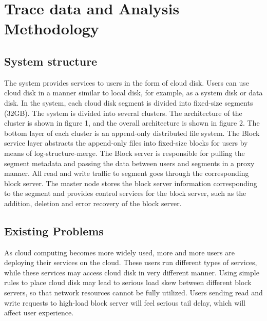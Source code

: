 \section{Trace data and Analysis Methodology}

\subsection{System structure}
\label{sec2.1}
The system provides services to users in the form of cloud disk. Users can use cloud disk in a manner similar to local disk, for example, as a system disk or data disk. In the system, each cloud disk segment is divided into fixed-size segments (32GB). The system is divided into several clusters. The architecture of the cluster is shown in figure 1, and the overall architecture is shown in figure 2. The bottom layer of each cluster is an append-only distributed file system. The Block service layer abstracts the append-only files into fixed-size blocks for users by means of log-structure-merge. The Block server is responsible for pulling the segment metadata and passing the data between users and segments in a proxy manner. All read and write traffic to segment goes through the corresponding block server. The master node stores the block server information corresponding to the segment and provides control services for the block server, such as the addition, deletion and error recovery of the block server. 


\subsection{Existing Problems}
\label{sec2.2}
As cloud computing becomes more widely used, more and more users are deploying their services on the cloud. These users run different types of services, while these services may access cloud disk in very different manner. Using simple rules to place cloud disk may lead to serious load skew between different block servers, so that network resources cannot be fully utilized. Users sending read and write requests to high-load block server will feel serious tail delay, which will affect user experience.


